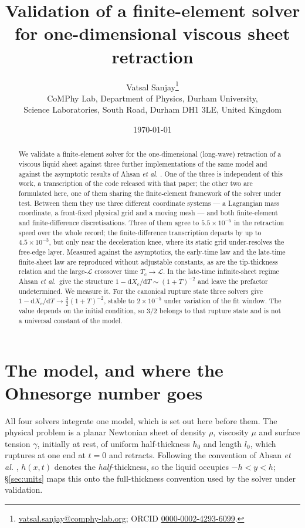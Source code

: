 \documentclass[11pt,a4paper]{article}
\title{Validation of a finite-element solver for one-dimensional viscous sheet
retraction}
\author{%
  Vatsal Sanjay\thanks{%
    \href{mailto:vatsal.sanjay@comphy-lab.org}{vatsal.sanjay@comphy-lab.org};
    ORCID \href{https://orcid.org/0000-0002-4293-6099}{0000-0002-4293-6099}.}\\[2pt]
  \normalsize CoMPhy Lab, Department of Physics, Durham University,\\
  \normalsize Science Laboratories, South Road, Durham DH1 3LE, United Kingdom}
\date{\today}
\newcommand{\Xc}{X_{c}}
\newcommand{\Tc}{T_{c}}
\begin{document}
\maketitle

\begin{abstract}
We validate a finite-element solver for the one-dimensional (long-wave)
retraction of a viscous liquid sheet against three further implementations of
the same model and against the asymptotic results of Ahsan \textit{et al.}
\cite{ahsan2025}. One of the three is independent of this work, a transcription
of the code released with that paper; the other two are formulated here, one of
them sharing the finite-element framework of the solver under test. Between them they use three different coordinate systems --- a Lagrangian
mass coordinate, a front-fixed physical grid and a moving mesh --- and both
finite-element and finite-difference discretisations. Three of them agree to
$5.5\times10^{-5}$ in the retraction speed over the whole record; the
finite-difference transcription departs by up to $4.5\times10^{-3}$, but only
near the deceleration knee, where its static grid under-resolves the free-edge
layer. Measured against the asymptotics, the early-time law and the late-time
finite-sheet law are reproduced without adjustable constants, as are the
tip-thickness relation and the large-$\mathcal{L}$ crossover time
$\Tc \to \mathcal{L}$. In the
late-time infinite-sheet regime Ahsan \textit{et al.}\ give the structure
$1 - \mathrm{d}\Xc/\mathrm{d}T \sim (1+T)^{-2}$ and leave the prefactor
undetermined. We measure it. For the canonical rupture state three solvers give
$1 - \mathrm{d}\Xc/\mathrm{d}T \to \tfrac{3}{2}(1+T)^{-2}$, stable to
$2\times10^{-5}$ under variation of the fit window. The value depends on the
initial condition, so $3/2$ belongs to that rupture state and is not a
universal constant of the model.
\end{abstract}

\section{The model, and where the Ohnesorge number goes}
\label{sec:model}

All four solvers integrate one model, which is set out here before them. The
physical problem is a
planar Newtonian sheet of density $\rho$, viscosity $\mu$ and surface tension
$\gamma$, initially at rest, of uniform half-thickness $h_{0}$ and length
$l_{0}$, which ruptures at one end at $t = 0$ and retracts. Following the
convention of Ahsan \textit{et al.} \cite{ahsan2025}, $h(x,t)$ denotes the
\emph{half}-thickness,
so the liquid occupies $-h < y < h$; \S\ref{sec:units} maps this onto the
full-thickness convention used by the solver under validation.
\end{document}

